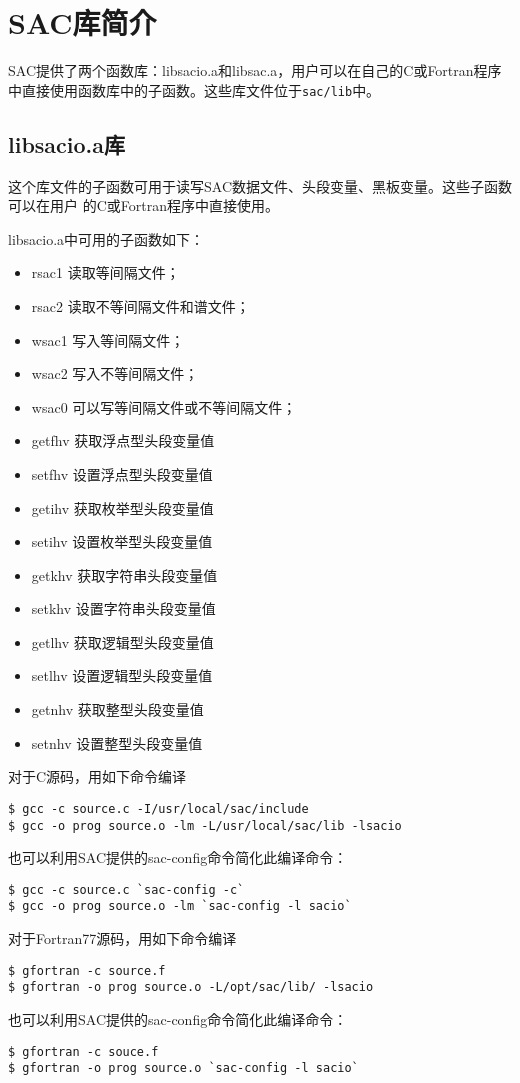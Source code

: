 \section{SAC库简介}
SAC提供了两个函数库：libsacio.a和libsac.a，用户可以在自己的C或Fortran程序
中直接使用函数库中的子函数。这些库文件位于\lstinline{sac/lib}中。

\subsection{libsacio.a库}
这个库文件的子函数可用于读写SAC数据文件、头段变量、黑板变量。这些子函数可以在用户
的C或Fortran程序中直接使用。

libsacio.a中可用的子函数如下：
\begin{itemize}
\item rsac1 读取等间隔文件；
\item rsac2 读取不等间隔文件和谱文件；
\item wsac1 写入等间隔文件；
\item wsac2 写入不等间隔文件；
\item wsac0 可以写等间隔文件或不等间隔文件；
\item getfhv 获取浮点型头段变量值
\item setfhv 设置浮点型头段变量值
\item getihv 获取枚举型头段变量值
\item setihv 设置枚举型头段变量值
\item getkhv 获取字符串头段变量值
\item setkhv 设置字符串头段变量值
\item getlhv 获取逻辑型头段变量值
\item setlhv 设置逻辑型头段变量值
\item getnhv 获取整型头段变量值
\item setnhv 设置整型头段变量值
\end{itemize}

对于C源码，用如下命令编译
\begin{lstlisting}[style=Shell]
$ gcc -c source.c -I/usr/local/sac/include
$ gcc -o prog source.o -lm -L/usr/local/sac/lib -lsacio
\end{lstlisting}
也可以利用SAC提供的sac-config命令简化此编译命令：
\begin{lstlisting}[style=Shell]
$ gcc -c source.c `sac-config -c`
$ gcc -o prog source.o -lm `sac-config -l sacio`
\end{lstlisting}

对于Fortran77源码，用如下命令编译
\begin{lstlisting}[style=Shell]
$ gfortran -c source.f
$ gfortran -o prog source.o -L/opt/sac/lib/ -lsacio
\end{lstlisting}
也可以利用SAC提供的sac-config命令简化此编译命令：
\begin{lstlisting}[style=Shell]
$ gfortran -c souce.f
$ gfortran -o prog source.o `sac-config -l sacio`
\end{lstlisting}

